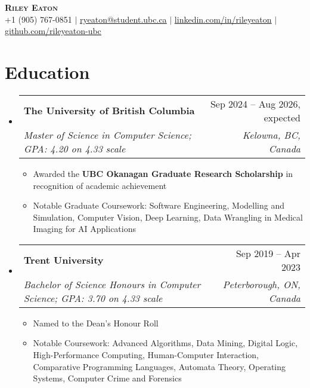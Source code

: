 \documentclass[letterpaper,11.5pt]{article}
\makeatletter
\newcommand{\resumeItem}[1]{
  \item\small{
    {#1 \vspace{-2pt}}
  }
}
\newcommand{\resumeSubheading}[4]{
  \vspace{-2pt}\item
    \begin{tabular*}{0.97\textwidth}[t]{l@{\extracolsep{\fill}}r}
      \textbf{#1} & #2 \\
      \textit{\small#3} & \textit{\small #4} \\
    \end{tabular*}\vspace{-7pt}
}
\newcommand{\resumeSubHeadingListStart}{\begin{itemize}[leftmargin=0.15in, label={}]}
\newcommand{\resumeSubHeadingListEnd}{\end{itemize}}
\newcommand{\resumeItemListStart}{\begin{itemize}}
\newcommand{\resumeItemListEnd}{\end{itemize}\vspace{-5pt}}
\def\iconSpace{0.5pt}
\makeatother
\begin{document}
\begin{center}
    \textbf{\Huge \scshape Riley Eaton} \\ \vspace{2pt}
    \small \faPhoneSquare \hspace{\iconSpace} +1 (905) 767-0851
    $|$ \faEnvelope \hspace{\iconSpace} \underline{\href{mailto:ryeaton@student.ubc.ca}{ryeaton@student.ubc.ca}}
    $|$ \faLinkedinSquare \hspace{\iconSpace} \underline{\href{https://linkedin.com/in/rileyeaton}{linkedin.com/in/rileyeaton}}
    $|$ \faGithub \hspace{\iconSpace} \underline{\href{https://github.com/rileyeaton-ubc}{github.com/rileyeaton-ubc}}
\end{center}

\section{Education}
  \resumeSubHeadingListStart
    \resumeSubheading
      {The University of British Columbia}{Sep 2024 -- Aug 2026, expected}
      {Master of Science in Computer Science; GPA: 4.20 on 4.33 scale}{Kelowna, BC, Canada}
      \resumeItemListStart
        \resumeItem{Awarded the \textbf{UBC Okanagan Graduate Research Scholarship} in recognition of academic achievement}
        \resumeItem{Notable Graduate Coursework: Software Engineering, Modelling and Simulation, Computer Vision, Deep Learning, Data Wrangling in Medical Imaging for AI Applications}
      \resumeItemListEnd
    \resumeSubheading
      {Trent University}{Sep 2019 -- Apr 2023}
      {Bachelor of Science Honours in Computer Science; GPA: 3.70 on 4.33 scale}{Peterborough, ON, Canada}
      \resumeItemListStart
        \resumeItem{Named to the Dean's Honour Roll}
        \resumeItem{Notable Coursework: Advanced Algorithms, Data Mining, Digital Logic, High-Performance Computing, Human-Computer Interaction, Comparative Programming Languages, Automata Theory, Operating Systems, Computer Crime and Forensics}
      \resumeItemListEnd
  \resumeSubHeadingListEnd

\end{document}
